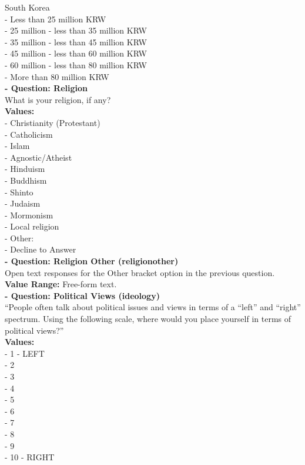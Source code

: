 \documentclass[12pt]{article}
\begin{document}
South Korea\\
 - Less than 25 million KRW\\
 - 25 million - less than 35 million KRW\\
 - 35 million - less than 45 million KRW\\
 - 45 million - less than 60 million KRW\\
 - 60 million - less than 80 million KRW\\
 - More than 80 million KRW\\


\noindent\textbf{  - Question: Religion} \\
What is your religion, if any?\\
\textbf{Values:}\\
 - Christianity (Protestant) \\
 - Catholicism\\
 - Islam\\
 - Agnostic/Atheist\\
 - Hinduism\\
 - Buddhism\\
 - Shinto\\
 - Judaism\\
 - Mormonism\\
 - Local religion\\
 - Other: \\
 - Decline to Answer\\


\noindent\textbf{  - Question: Religion Other (religionother)} \\
Open text responses for the Other bracket option in the previous question.\\
\noindent\textbf{Value Range:} Free-form text.\\




\noindent\textbf{  - Question: Political Views (ideology)} \\
``People often talk about political issues and views in terms of a “left” and “right” spectrum. Using the following scale, where would you place yourself in terms of political views?''\\
\textbf{Values:}\\
 - 1 - LEFT\\
 - 2\\
 - 3\\
 - 4\\
 - 5\\
 - 6\\
 - 7\\
 - 8\\
 - 9\\
 - 10 - RIGHT\\
\end{document}
